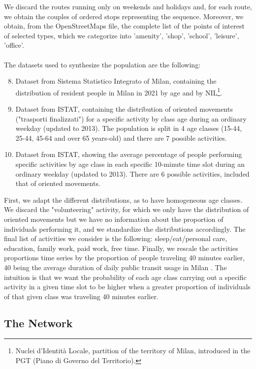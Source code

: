 We discard the routes running only on weekends and holidays and, for each route, we obtain the couples of ordered stops representing the sequence. Moreover, we obtain, from the OpenStreetMaps file, the complete list of the points of interest of selected types, which we categorize into 'amenity', 'shop', 'school', 'leisure', 'office'. \\\\
The datasets used to synthesize the population are the following:
\begin{enumerate}
\setcounter{enumi}{7}
    \item Dataset \cite{site18} from Sistema Statistico Integrato of Milan, containing the distribution of resident people in Milan in 2021 by age and by NIL\footnote{Nuclei d'Identità Locale, partition of the territory of Milan, introduced in the PGT (Piano di Governo del Territorio).}.
    \item Dataset \cite{site10} from ISTAT, containing the distribution of oriented movements ("trasporti finalizzati") for a specific activity by class age during an ordinary weekday (updated to 2013). The population is split in 4 age classes (15-44, 25-44, 45-64 and over 65 years-old) and there are 7 possible activities.
    \item Dataset \cite{site11} from ISTAT, showing the average percentage of people performing specific activities by age class in each specific 10-minute time slot during an ordinary weekday (updated to 2013). There are 6 possible activities, included that of oriented movements.
\end{enumerate}
First, we adapt the different distributions, as to have homogeneous age classes. We discard the "volunteering" activity, for which we only have the distribution of oriented movements but we have no information about the proportion of individuals performing it, and we standardize the distributions accordingly. The final list of activities we consider is the following: sleep/eat/personal care, education, family work, paid work, free time. Finally, we rescale the activities proportions time series by the proportion of people traveling 40 minutes earlier, 40 being the average duration of daily public transit usage in Milan \cite{bib2}. The intuition is that we want the probability of each age class carrying out a specific activity in a given time slot to be higher when a greater proportion of individuals of that given class was traveling 40 minutes earlier.

\subsection{The Network}\label{sec3}

